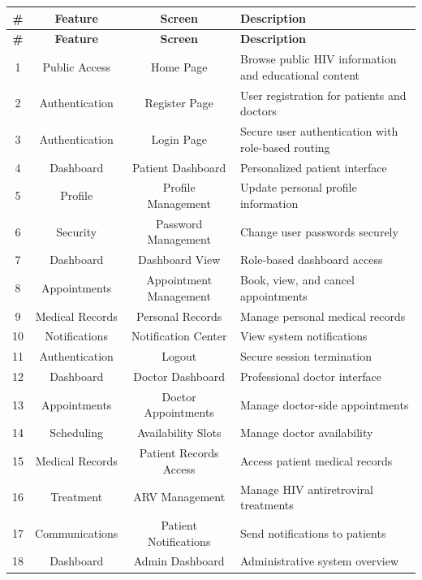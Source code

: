 \documentclass[12pt,a4paper]{article}
\begin{document}
\begin{longtable}{|c|c|c|p{8.5cm}|}
\hline
\textbf{\#} & \textbf{Feature} & \textbf{Screen} & \textbf{Description} \\
\hline
\endfirsthead

\hline
\textbf{\#} & \textbf{Feature} & \textbf{Screen} & \textbf{Description} \\
\hline
\endhead

1 & Public Access & Home Page & Browse public HIV information and educational content \\
\hline
2 & Authentication & Register Page & User registration for patients and doctors \\
\hline
3 & Authentication & Login Page & Secure user authentication with role-based routing \\
\hline
4 & Dashboard & Patient Dashboard & Personalized patient interface \\
\hline
5 & Profile & Profile Management & Update personal profile information \\
\hline
6 & Security & Password Management & Change user passwords securely \\
\hline
7 & Dashboard & Dashboard View & Role-based dashboard access \\
\hline
8 & Appointments & Appointment Management & Book, view, and cancel appointments \\
\hline
9 & Medical Records & Personal Records & Manage personal medical records \\
\hline
10 & Notifications & Notification Center & View system notifications \\
\hline
11 & Authentication & Logout & Secure session termination \\
\hline
12 & Dashboard & Doctor Dashboard & Professional doctor interface \\
\hline
13 & Appointments & Doctor Appointments & Manage doctor-side appointments \\
\hline
14 & Scheduling & Availability Slots & Manage doctor availability \\
\hline
15 & Medical Records & Patient Records Access & Access patient medical records \\
\hline
16 & Treatment & ARV Management & Manage HIV antiretroviral treatments \\
\hline
17 & Communications & Patient Notifications & Send notifications to patients \\
\hline
18 & Dashboard & Admin Dashboard & Administrative system overview \\

\end{longtable}
\end{document}
